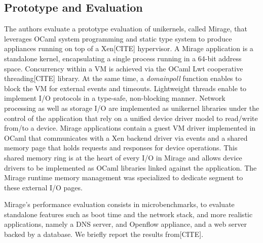 \subsection{Prototype and Evaluation}
%
%
%
%
The authors evaluate a prototype evaluation of unikernels, called Mirage, that leverages OCaml system programming and static type system to produce appliances running on top of a Xen[CITE] hypervisor.
A Mirage application is a standalone kernel, encapsulating a single process running in a 64-bit address space.
Concurrency within a VM is achieved via the OCaml Lwt cooperative threading[CITE] library.
At the same time, a \emph{domainpoll} function enables to block the VM for external events and timeouts.
Lightweight threads enable to implement I/O protocols in a type-safe, non-blocking manner.
Network processing as well as storage I/O are implemented as unikernel libraries under the control of the application that rely on a unified device driver model to read/write from/to a device.
Mirage applications contain a guest VM driver implemented in OCaml that communicates with a Xen backend driver via events and a shared memory page that holds requests and responses for device operations.
This shared memory ring is at the heart of every I/O in Mirage and allows device drivers to be implemented as OCaml libraries linked against the application.
The Mirage runtime memory management was specialized to dedicate segment to these external I/O pages.

Mirage's performance evaluation consists in microbenchmarks, to evaluate standalone features such as boot time and the network stack, and more realistic applications, namely a DNS server, and Openflow appliance, and a web server backed by a database.
We briefly report the results from[CITE].

